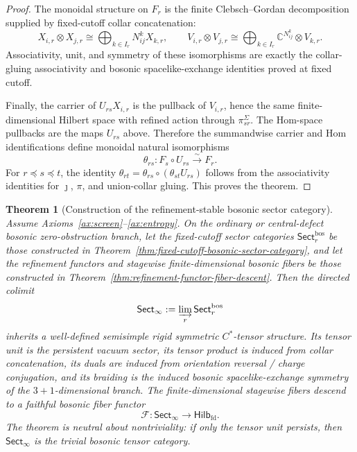\documentclass[11pt]{article}
\newtheorem{theorem}{Theorem}[section]
\begin{document}
\begin{proof}
The monoidal structure on \(F_r\) is the finite Clebsch--Gordan decomposition supplied by
fixed-cutoff collar concatenation:
\[
X_{i,r}\otimes X_{j,r}\cong
\bigoplus_{k\in I_r}N_{ij}^{k}X_{k,r},
\qquad
V_{i,r}\otimes V_{j,r}\cong
\bigoplus_{k\in I_r}\mathbb C^{N_{ij}^{k}}\otimes V_{k,r}.
\]
Associativity, unit, and symmetry of these isomorphisms are exactly the collar-gluing
associativity and bosonic spacelike-exchange identities proved at fixed cutoff.

Finally, the carrier of \(U_{rs}X_{i,r}\) is the pullback of \(V_{i,r}\), hence the same
finite-dimensional Hilbert space with refined action through \(\pi_{sr}^{\Sigma}\). The Hom-space
pullbacks are the maps \(U_{rs}\) above. Therefore the summandwise carrier and Hom identifications
define monoidal natural isomorphisms
\[
\theta_{rs}:F_s\circ U_{rs}\xrightarrow{\sim}F_r.
\]
For \(r\preceq s\preceq t\), the identity
\(\theta_{rt}=\theta_{rs}\circ(\theta_{st}U_{rs})\) follows from the associativity identities for
\(\jmath\), \(\pi\), and union-collar gluing. This proves the theorem.
\end{proof}

\begin{theorem}[Construction of the refinement-stable bosonic sector category]\label{thm:sector-colimit}
Assume Axioms~\ref{ax:screen}--\ref{ax:entropy}. On the ordinary or central-defect bosonic
zero-obstruction branch, let the fixed-cutoff sector categories
\(\mathsf{Sect}^{\mathrm{bos}}_r\) be those constructed in
Theorem~\ref{thm:fixed-cutoff-bosonic-sector-category}, and let the refinement functors and
stagewise finite-dimensional bosonic fibers be those constructed in
Theorem~\ref{thm:refinement-functor-fiber-descent}. Then the directed colimit
\[
\mathsf{Sect}_\infty:=\varinjlim_r \mathsf{Sect}^{\mathrm{bos}}_r
\]
inherits a well-defined semisimple rigid symmetric \(C^*\)-tensor structure. Its tensor unit is
the persistent vacuum sector, its tensor product is induced from collar concatenation, its duals
are induced from orientation reversal / charge conjugation, and its braiding is the induced
bosonic spacelike-exchange symmetry of the \(3+1\)-dimensional branch. The finite-dimensional
stagewise fibers descend to a faithful bosonic fiber functor
\[
\mathcal F:\mathsf{Sect}_\infty\to\mathsf{Hilb}_{\mathrm{fd}}.
\]
The theorem is neutral about nontriviality: if only the tensor unit persists, then
\(\mathsf{Sect}_\infty\) is the trivial bosonic tensor category.
\end{theorem}
\end{document}
